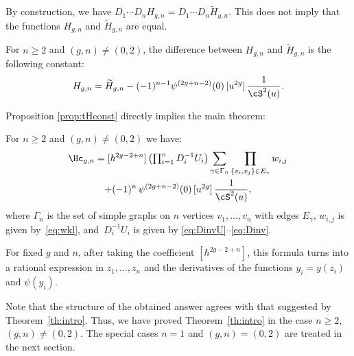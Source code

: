 By construction, we have $D_1\cdots D_n H_{g,n}=D_1\cdots D_n \widetilde H_{g,n}$. This does not imply that the functions $H_{g,n}$ and $\widetilde H_{g,n}$ are equal.

\begin{proposition}\label{prop:tHconst}
For $n\geq 2$ and $(g,n)\ne(0,2)$, the difference between $H_{g,n}$ and $\widetilde{H}_{g,n}$ is the following constant:
\begin{equation}\label{eq:tHconst}
H_{g,n} = \widetilde{H}_{g,n} - (-1)^{n-1}
\psi^{(2g+n-2)}(0)\,[u^{2g}]\,\frac1{\cS^2(u)}.
\end{equation}
\end{proposition}

Proposition \ref{prop:tHconst} directly implies the main theorem:
\begin{theorem}\label{th:MainTh}
For $n\geq 2$ and $(g,n)\ne(0,2)$ we have:
\begin{multline}\label{eq:mainth}
\Hc_{g,n}= [\hbar^{2g-2+n}] \left(\textstyle\prod_{i=1}^n D_i^{-1}U_i\right) \sum\limits_{\gamma\in\Gamma_n}\prod\limits_{\{v_i,v_j\}\in E_\gamma} w_{i,j}\\
+ (-1)^{n}\,\psi^{(2g+n-2)}(0)\,[u^{2g}]\,\frac1{\cS^2(u)},
\end{multline}
where $\Gamma_n$ is the set of simple graphs on $n$ vertices $v_1,\ldots,v_n$ with edges $E_\gamma$, $w_{i,j}$ is given by~\eqref{eq:wkl}, and~$D_i^{-1}U_i$ is given by \eqref{eq:DinvU}--\eqref{eq:Dinv}.

For fixed $g$ and $n$, after taking the coefficient $[\hbar^{2g-2+n}]$,
this formula turns into a rational expression in $z_1,\ldots,z_n$ and the derivatives of the functions $y_i=y(z_i)$ and $\psi(y_i)$.
\end{theorem}
\begin{remark}
Note that the structure of the obtained answer agrees with that suggested by Theorem~\ref{th:intro}. Thus, we have proved Theorem~\ref{th:intro} in the case $n\ge2$, $(g,n)\ne(0,2)$.
The special cases $n=1$ and $(g,n)=(0,2)$ are treated in the next section.
\end{remark}
